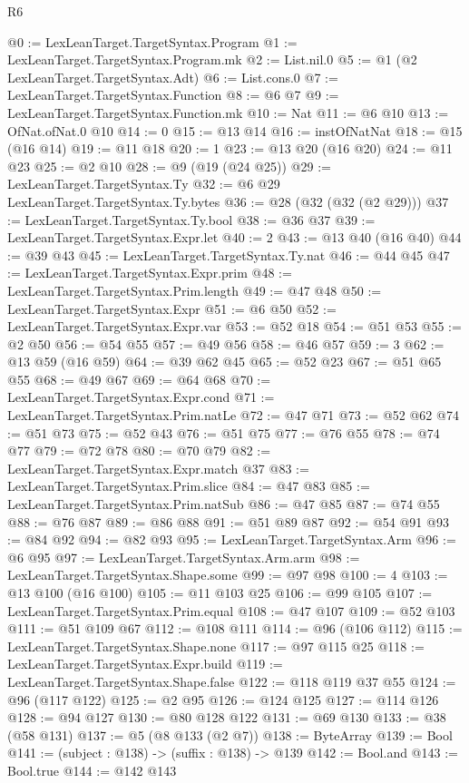 \begin{lexlean}{R6}
\begin{coremodule}
@0 := LexLeanTarget.TargetSyntax.Program
@1 := LexLeanTarget.TargetSyntax.Program.mk
@2 := List.nil.{0}
@5 := @1 (@2 LexLeanTarget.TargetSyntax.Adt)
@6 := List.cons.{0}
@7 := LexLeanTarget.TargetSyntax.Function
@8 := @6 @7
@9 := LexLeanTarget.TargetSyntax.Function.mk
@10 := Nat
@11 := @6 @10
@13 := OfNat.ofNat.{0} @10
@14 := 0
@15 := @13 @14
@16 := instOfNatNat
@18 := @15 (@16 @14)
@19 := @11 @18
@20 := 1
@23 := @13 @20 (@16 @20)
@24 := @11 @23
@25 := @2 @10
@28 := @9 (@19 (@24 @25))
@29 := LexLeanTarget.TargetSyntax.Ty
@32 := @6 @29 LexLeanTarget.TargetSyntax.Ty.bytes
@36 := @28 (@32 (@32 (@2 @29)))
@37 := LexLeanTarget.TargetSyntax.Ty.bool
@38 := @36 @37
@39 := LexLeanTarget.TargetSyntax.Expr.let
@40 := 2
@43 := @13 @40 (@16 @40)
@44 := @39 @43
@45 := LexLeanTarget.TargetSyntax.Ty.nat
@46 := @44 @45
@47 := LexLeanTarget.TargetSyntax.Expr.prim
@48 := LexLeanTarget.TargetSyntax.Prim.length
@49 := @47 @48
@50 := LexLeanTarget.TargetSyntax.Expr
@51 := @6 @50
@52 := LexLeanTarget.TargetSyntax.Expr.var
@53 := @52 @18
@54 := @51 @53
@55 := @2 @50
@56 := @54 @55
@57 := @49 @56
@58 := @46 @57
@59 := 3
@62 := @13 @59 (@16 @59)
@64 := @39 @62 @45
@65 := @52 @23
@67 := @51 @65 @55
@68 := @49 @67
@69 := @64 @68
@70 := LexLeanTarget.TargetSyntax.Expr.cond
@71 := LexLeanTarget.TargetSyntax.Prim.natLe
@72 := @47 @71
@73 := @52 @62
@74 := @51 @73
@75 := @52 @43
@76 := @51 @75
@77 := @76 @55
@78 := @74 @77
@79 := @72 @78
@80 := @70 @79
@82 := LexLeanTarget.TargetSyntax.Expr.match @37
@83 := LexLeanTarget.TargetSyntax.Prim.slice
@84 := @47 @83
@85 := LexLeanTarget.TargetSyntax.Prim.natSub
@86 := @47 @85
@87 := @74 @55
@88 := @76 @87
@89 := @86 @88
@91 := @51 @89 @87
@92 := @54 @91
@93 := @84 @92
@94 := @82 @93
@95 := LexLeanTarget.TargetSyntax.Arm
@96 := @6 @95
@97 := LexLeanTarget.TargetSyntax.Arm.arm
@98 := LexLeanTarget.TargetSyntax.Shape.some
@99 := @97 @98
@100 := 4
@103 := @13 @100 (@16 @100)
@105 := @11 @103 @25
@106 := @99 @105
@107 := LexLeanTarget.TargetSyntax.Prim.equal
@108 := @47 @107
@109 := @52 @103
@111 := @51 @109 @67
@112 := @108 @111
@114 := @96 (@106 @112)
@115 := LexLeanTarget.TargetSyntax.Shape.none
@117 := @97 @115 @25
@118 := LexLeanTarget.TargetSyntax.Expr.build
@119 := LexLeanTarget.TargetSyntax.Shape.false
@122 := @118 @119 @37 @55
@124 := @96 (@117 @122)
@125 := @2 @95
@126 := @124 @125
@127 := @114 @126
@128 := @94 @127
@130 := @80 @128 @122
@131 := @69 @130
@133 := @38 (@58 @131)
@137 := @5 (@8 @133 (@2 @7))
@138 := ByteArray
@139 := Bool
@141 := (subject : @138) -> (suffix : @138) -> @139
@142 := Bool.and
@143 := Bool.true
@144 := @142 @143

\end{coremodule}
\end{lexlean}
